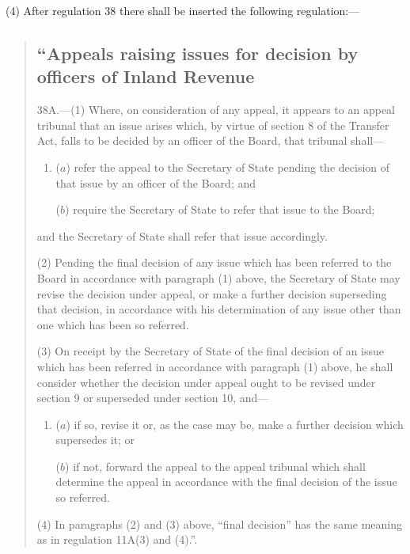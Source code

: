 \documentclass[12pt,a4paper]{article}
\begin{document}
(4) After regulation 38 there shall be inserted the following regulation:—
\begin{quotation}
\subsection*{“Appeals raising issues for decision by officers of Inland Revenue}

38A.---(1)  Where, on consideration of any appeal, it appears to an appeal tribunal that an issue arises which, by virtue of section 8 of the Transfer Act, falls to be decided by an officer of the Board, that tribunal shall—
\begin{enumerate}\item[]
($a$) refer the appeal to the Secretary of State pending the decision of that issue by an officer of the Board; and

($b$) require the Secretary of State to refer that issue to the Board;
\end{enumerate}
and the Secretary of State shall refer that issue accordingly.

(2) Pending the final decision of any issue which has been referred to the Board in accordance with paragraph (1) above, the Secretary of State may revise the decision under appeal, or make a further decision superseding that decision, in accordance with his determination of any issue other than one which has been so referred.

(3) On receipt by the Secretary of State of the final decision of an issue which has been referred in accordance with paragraph (1) above, he shall consider whether the decision under appeal ought to be revised under section 9 or superseded under section 10, and—
\begin{enumerate}\item[]
($a$) if so, revise it or, as the case may be, make a further decision which supersedes it; or

($b$) if not, forward the appeal to the appeal tribunal which shall determine the appeal in accordance with the final decision of the issue so referred.
\end{enumerate}

(4) In paragraphs (2) and (3) above, “final decision” has the same meaning as in regulation 11A(3) and (4).”.
\end{quotation}

%
%
\end{document}
